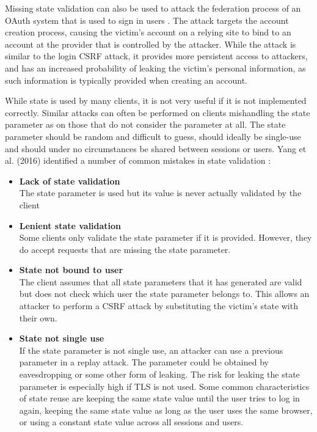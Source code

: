 Missing state validation can also be used to attack the federation process of an OAuth system that is used to sign in users \citep{chow_security_2014}.
The attack targets the account creation process, causing the victim's account on a relying site to bind to an account at the provider that is controlled by the attacker.
While the attack is similar to the login CSRF attack, it provides more persistent access to attackers, and has an increased probability of leaking the victim's personal information, as such information is typically provided when creating an account.

While state is used by many clients, it is not very useful if it is not implemented correctly.
Similar attacks can often be performed on clients mishandling the state parameter as on those that do not consider the parameter at all.
The state parameter should be random and difficult to guess, should ideally be single-use and should under no circumstances be shared between sessions or users.
Yang et al. (2016) identified a number of common mistakes in state validation \citep{yang_model-based_2016}:
\begin{itemize}
    \item \textbf{Lack of state validation} \\ 
    The state parameter is used but its value is never actually validated by the client
    \item \textbf{Lenient state validation} \\
    Some clients only validate the state parameter if it is provided. However, they do accept requests that are missing the state parameter.
    \item \textbf{State not bound to user} \\
    The client assumes that all state parameters that it has generated are valid but does not check which user the state parameter belongs to.
    This allows an attacker to perform a CSRF attack by substituting the victim's state with their own.
    \item \textbf{State not single use} \\
    If the state parameter is not single use, an attacker can use a previous parameter in a replay attack.
    The parameter could be obtained by eavesdropping or some other form of leaking.
    The risk for leaking the state parameter is especially high if TLS is not used. Some common characteristics of state reuse are keeping the same state value until the user tries to log in again, keeping the same state value as long as the user uses the same browser, or using a constant state value across all sessions and users.
\end{itemize}


